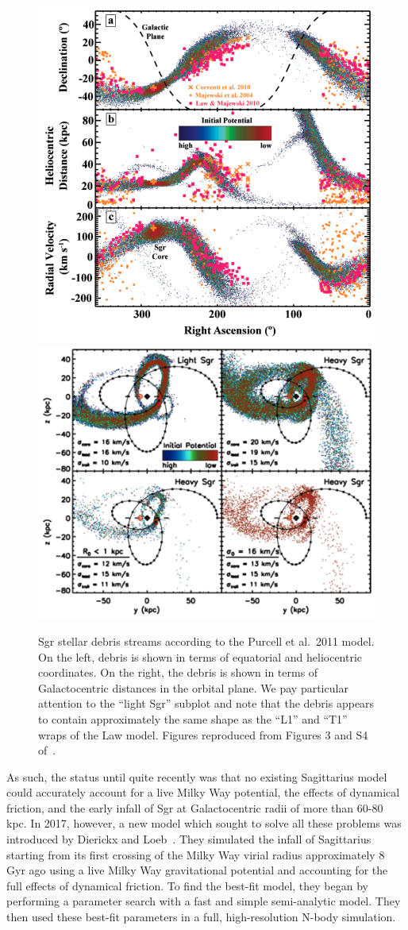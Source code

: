\begin{figure}
    \centering 
    \includegraphics[width=0.41\linewidth]{figs/purcell2011-3.png}
    \includegraphics[width=0.5\linewidth]{figs/purcell2011-s4.png}
    \caption{%
        Sgr stellar debris streams according to the Purcell et al.~2011 model.
        On the left, debris is shown in terms of equatorial and heliocentric
        coordinates. On the right, the debris is shown in terms of
        Galactocentric distances in the orbital plane. We pay particular
        attention to the ``light Sgr'' subplot and note that the debris
        appears to contain approximately the same shape as the ``L1'' and
        ``T1'' wraps of the Law model. Figures reproduced from Figures 3 and
        S4 of~\cite{purcell_sagittarius_2011}.
    }
    \label{fig:purcell}
\end{figure}

As such, the status until quite recently was that no existing Sagittarius
model could accurately account for a live Milky Way potential, the effects of
dynamical friction, and the early infall of Sgr at Galactocentric radii of
more than 60-80 kpc.  In 2017, however, a new model which sought to solve all
these problems was introduced by Dierickx and
Loeb~\cite{dierickx_predicted_2017}.  They simulated the infall of Sagittarius
starting from its first crossing of the Milky Way virial radius approximately
8 Gyr ago using a live Milky Way gravitational potential and accounting for
the full effects of dynamical friction.  To find the best-fit model, they
began by performing a parameter search with a fast and simple semi-analytic
model.  They then used these best-fit parameters in a full, high-resolution
N-body simulation.

